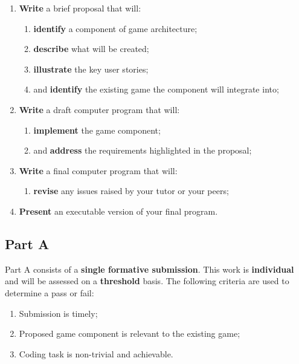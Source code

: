\documentclass{../fal_assignment}
\begin{document}
\begin{enumerate}[label=(\alph*)]
    \item \textbf{Write} a brief proposal that will:
    	\begin{enumerate}[label=\roman*.]
    		\item \textbf{identify} a component of game architecture;
    		\item \textbf{describe} what will be created;
    		\item \textbf{illustrate} the key user stories;
    		\item and \textbf{identify} the existing game the component will integrate into;
	\end{enumerate}
    \item \textbf{Write} a draft computer program that will:
        	\begin{enumerate}[label=\roman*.]
    		\item \textbf{implement} the game component;
    		\item and \textbf{address} the requirements highlighted in the proposal;
	\end{enumerate}
    \item \textbf{Write} a final computer program that will:
    	\begin{enumerate}[label=\roman*.]
    		\item \textbf{revise} any issues raised by your tutor or your peers;
	\end{enumerate}
    \item \textbf{Present} an executable version of your final program.
\end{enumerate}


\subsection*{Part A}

Part A consists of a \textbf{single formative submission}. This work is \textbf{individual} and will be assessed on a \textbf{threshold} basis. The following criteria are used to determine a pass or fail:

\begin{enumerate}[label=(\alph*)]
	\item Submission is timely;
	\item Proposed game component is relevant to the existing game;
	\item Coding task is non-trivial and achievable.
\end{enumerate}
\end{document}

